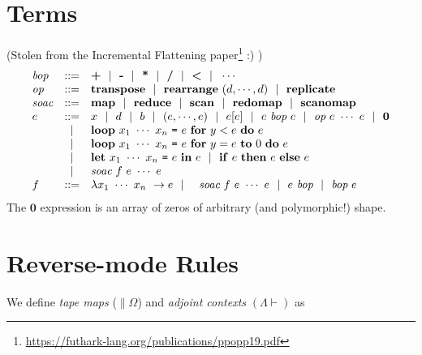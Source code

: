 \documentclass[a4paper]{report}
\newcommand{\LoopR}[5]{\kw{loop}~#1~\texttt{=}~#2~\kw{for}~#3=#4~\kw{to}~0~\kw{do}~#5}
\begin{document}
\section*{Terms}
(Stolen from the Incremental Flattening paper\footnote{\url{https://futhark-lang.org/publications/ppopp19.pdf}} :) )
\[
\begin{array}{lcl}
  \id{bop} & ::= & \kw{+} ~~|~~ \kw{-} ~~|~~ \kw{*} ~~|~~ \kw{/} ~~|~~ \kw{<} ~~|~~ \cdots \\
  \id{op} & ::= & \Transpose ~~|~~ \Rearrange~\Par{d,\cdots{},d} ~~|~~ \Replicate \\
  \id{soac} & ::= & \Map ~~|~~ \Reduce ~~|~~ \Scan ~~|~~ \Redomap ~~|~~ \Scanomap\\
  e & ::= & x ~~|~~ d ~~|~~ b ~~|~~ \Par{e,\cdots{},e} ~~|~~ e\SqPar{e} ~~|~~ e~\id{bop}~e
      ~~|~~ \id{op}~e~\cdots{}~e ~~|~~ {\mathbf 0} \\
  & |   & \Loop{x_1~\cdots{}~x_n}{e}{y}{e}{e} \\
    & |   & \LoopR{x_1~\cdots{}~x_n}{e}{y}{e}{e} \\
    & |   & \Let{x_1~\cdots{}~x_n}{e}{e} ~~|~~ \If{e}{e}{e} \\
    & |   & \id{soac} ~f~ e~\cdots{}~e \\
  f & ::= & \FnU{x_1~\cdots{}~x_n}{e} ~~|~~ ~~\id{soac}~f~e~\cdots{}~e ~~|~~ e~\id{bop} ~~|~~ \id{bop}~e
\end{array}
\]
The ${\mathbf 0}$ expression is an array of zeros of arbitrary (and polymorphic!) shape.

\section*{Reverse-mode Rules}
We define \emph{tape maps} ($\parallel \Omega$) and \emph{adjoint contexts} $(\Lambda \vdash)$ as
\end{document}
